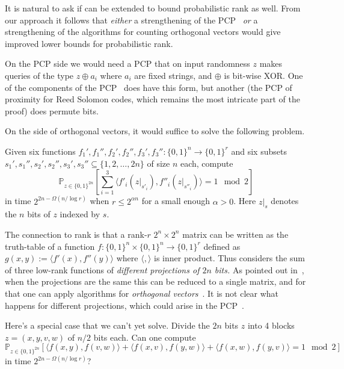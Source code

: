 \documentclass{toc}
\newcommand{\zo}{\{0, 1\}}
\renewcommand{\P}{\mathbb{P}}
\begin{document}
It is natural to ask if 
can be extended to bound probabilistic rank as well. From our approach
it follows that \emph{either} a strengthening of the PCP~\cite{Ben-SassonV-AC0PCP}
\emph{or }a strengthening of the algorithms for counting orthogonal
vectors \cite{DBLP:conf/soda/AbboudWY15,DBLP:conf/soda/ChanW16} would
give improved lower bounds for probabilistic rank.

On the PCP side we would need a PCP that on input randomness $z$
makes queries of the type $z\oplus a_{i}$ where $a_{i}$ are fixed
strings, and $\oplus$ is bit-wise XOR. One of the components of the
PCP~\cite{Ben-SassonV-AC0PCP} does have this form, but another (the
PCP of proximity for Reed Solomon codes, which remains the most intricate
part of the proof) does permute bits.

On the side of orthogonal vectors,
%
%
it would suffice to solve the following problem.
\begin{problem}
\label{prob:Given-six-functions}Given six functions $f_{1}',f_{1}'',f_{2}',f_{2}'',f_{3}',f_{3}'':\zo^{n}\to\zo^{r}$
and six subsets $s_{1}',s_{1}'',s_{2}',s_{2}'',s_{3}',s_{3}''\subseteq\{1,2,\ldots,2n\}$
of size $n$ each, compute
\[
\P_{z\in\zo^{2n}}\left[\sum_{i=1}^{3}\langle f'_{i}(z|_{s'_{i}}),f''_{i}(z|_{s''_{i}})\rangle=1\mod2\right]
\]
in time $2^{2n-\Omega(n/\log r)}$ when $r\le2^{\alpha n}$ for a
small enough $\alpha>0$. Here $z|_{s}$ denotes the $n$ bits of
$z$ indexed by $s$.
\end{problem}

The connection to rank is that a rank-$r$ $2^{n}\times2^{n}$ matrix
can be written as the truth-table of a function $f:\zo^{n}\times\zo^{n}\to\zo^{r}$
defined as $g(x,y):=\langle f'(x),f''(y)\rangle$ where $\langle,\rangle$
is inner product. Thus  considers
the sum of three low-rank functions of \emph{different projections
of $2n$ bits. }As pointed out in~\cite{AlmanC19}, when the projections
are the same this can be reduced to a single matrix, and for that
one can apply algorithms for \emph{orthogonal vectors}~\cite{DBLP:conf/soda/ChanW16}.
It is not clear what happens for different projections, which could
arise in the PCP~\cite{Ben-SassonV-AC0PCP}.

Here's a special case that we can't yet solve. Divide the $2n$ bits
$z$ into 4 blocks $z=(x,y,v,w)$ of $n/2$ bits each. Can one compute
\[
\P_{z\in\zo^{2n}}[\langle f(x,y),f(v,w)\rangle+\langle f(x,v),f(y,w)\rangle+\langle f(x,w),f(y,v)\rangle=1\mod2]
\]
in time $2^{2n-\Omega(n/\log r)}$?
\end{document}
